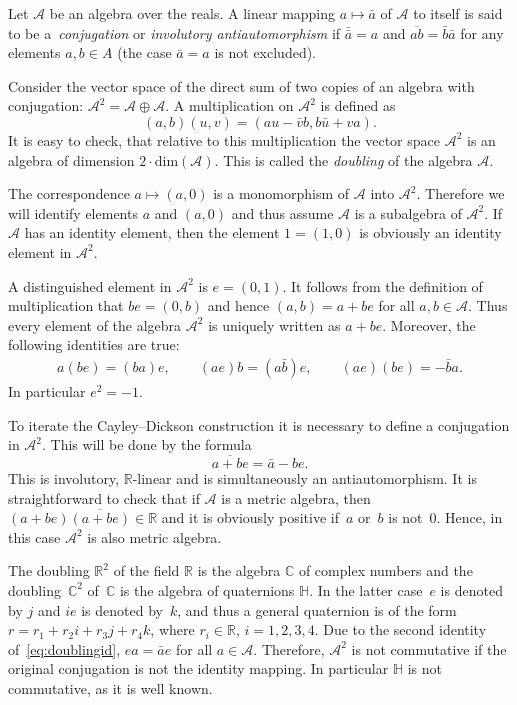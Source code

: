 \documentclass[pdftex]{sigma}
\numberwithin{equation}{section}
\newcommand{\SR}{\mathbb{R}} %
\newcommand{\SC}{\mathbb{C}} %
\newcommand{\SH}{\mathbb{H}} %
\begin{document}
Let $\mathcal{A}$ be an algebra over the reals. A linear mapping $a \mapsto \bar{a}$ of $\mathcal{A}$ to itself is said to be a~\textit{conjugation} or \textit{involutory antiautomorphism} if $\bar{\bar{a}}=a$ and $\overline{ab}=\bar{b}\bar{a}$ for any elements $a,b \in A$ (the case $\bar{a}=a$ is not excluded).
\begin{Definition} Consider the vector space of the direct sum of two copies of an algebra with conjugation: $\mathcal{A}^2=\mathcal{A} \oplus \mathcal{A}$. A multiplication on $\mathcal{A}^2$ is defined as
 \[(a,b)(u,v)=(au-\bar{v}b,b\bar{u}+va).\]
 It is easy to check, that relative to this multiplication the vector space $\mathcal{A}^2$ is an algebra of dimension $2 \cdot \mathrm{dim}(\mathcal{A})$. This is called the \textit{doubling} of the algebra $\mathcal{A}$.
\end{Definition}
\begin{Remark} The correspondence $a \mapsto (a,0)$ is a monomorphism of $\mathcal{A}$ into $\mathcal{A}^2$. Therefore we will identify elements $a$ and $(a,0)$ and thus assume $\mathcal{A}$ is a subalgebra of $\mathcal{A}^2$. If $\mathcal{A}$ has an identity element, then the element $1=(1,0)$ is obviously an identity element in $\mathcal{A}^2$.
\end{Remark}
A distinguished element in $\mathcal{A}^2$ is $e=(0,1)$. It follows from the definition of multiplication that $be=(0,b)$ and hence $(a,b)=a+be$ for all $a,b\in \mathcal{A}$. Thus every element of the algebra $\mathcal{A}^2$ is uniquely written as $a+be$. Moreover, the following identities are true:
\begin{gather}a(be)=(ba)e, \qquad (ae)b=(a\bar{b})e, \qquad (ae)(be)=-\bar{b}a.\label{eq:doublingid}
\end{gather}
In particular $e^2=-1$.

To iterate the Cayley--Dickson construction it is necessary to define a conjugation in $\mathcal{A}^2$. This will be done by the formula
\[\overline{a+be}=\bar{a}-be.\]
This is involutory, $\SR$-linear and is simultaneously an antiautomorphism. It is straightforward to check that if $\mathcal{A}$ is a metric algebra, then $(a+be)\overline{(a+be)} \in \SR$ and it is obviously positive if~$a$ or~$b$ is not~0. Hence, in this case $\mathcal{A}^2$ is also metric algebra.

The doubling $\SR^2$ of the field $\SR$ is the algebra $\SC$ of complex numbers and the doubling~$\SC^2$ of~$\SC$ is the algebra of quaternions $\SH$. In the latter case~$e$ is denoted by $j$ and $ie$ is denoted by~$k$, and thus a general quaternion is of the form $r=r_1+r_2i+r_3j+r_4k$, where $r_i \in \SR$, $i=1,2,3,4$. Due to the second identity of~\eqref{eq:doublingid}, $ea=\bar{a}e$ for all $a \in \mathcal{A}$. Therefore, $\mathcal{A}^2$ is not commutative if the original conjugation is not the identity mapping. In particular $\SH$ is not commutative, as it is well known.
\end{document}
